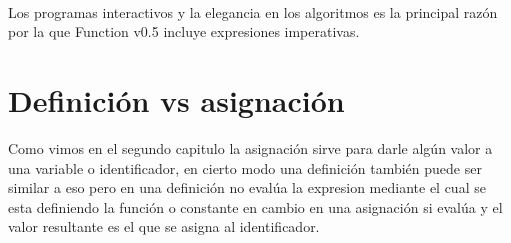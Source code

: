       \begin{fxcode}
         \\
         \\
         \\
         \\
         \\
         \\
         \\
         \\
         \outcode{()                           }
      \end{fxcode}
      
      Los programas interactivos y la elegancia en los algoritmos es la principal razón por la que Function v0.5 incluye expresiones imperativas.
            
   \section{Definición vs asignación}
      Como vimos en el segundo capitulo la asignación sirve para darle algún valor a una variable o identificador, en cierto modo una definición también puede ser similar a eso pero en una definición no evalúa la expresion mediante el cual se esta definiendo la función o constante en cambio en una asignación si evalúa y el valor resultante es el que se asigna al identificador.
      
      \begin{fxcode}
          \\
         \\
          \\
         \\
          \\
         \\
          \\
      \end{fxcode}
      
